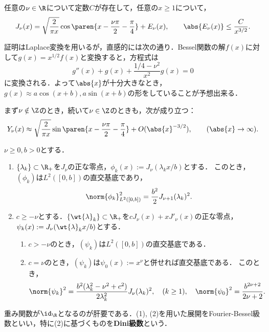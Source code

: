 \documentclass[uplatex,dvipdfmx]{jsreport}
\begin{document}
\begin{theorem}[漸近挙動]
    任意の$\nu\in\R$について定数$C$が存在して，任意の$x\ge1$について，
    \[J_\nu(x)=\sqrt{\frac{2}{\pi x}}\cos\paren{x-\frac{\nu\pi}{2}-\frac{\pi}{4}}+E_\nu(x),\qquad \abs{E_\nu(x)}\le\frac{C}{x^{3/2}}.\]
\end{theorem}
\begin{remarks}
    証明はLaplace変換を用いるが，直感的には次の通り．Bessel関数の解$f(x)$に対して$g(x)=x^{1/2}f(x)$と変換すると，方程式は
    \[g''(x)+g(x)+\frac{1/4-\nu^2}{x^2}g(x)=0\]
    に変換される．よって$\abs{x}$が十分大きなとき，$g(x)\approx a\cos(x+b),a\sin(x+b)$の形をしていることが予想出来る．
\end{remarks}

\begin{corollary}
    まず$\nu\notin\Z$のとき，続いて$\nu\in\Z$のときも，次が成り立つ：
    \[Y_\nu(x)\approx\sqrt{\frac{2}{\pi x}}\sin\paren{x-\frac{\nu\pi}{2}-\frac{\pi}{4}}+O(\abs{x}^{-3/2}),\qquad (\abs{x}\to\infty).\]
\end{corollary}

\begin{theorem}
    $\nu\ge0,b>0$とする．
    \begin{enumerate}
        \item $\{\lambda_k\}\subset\R_+$を$J_\nu$の正な零点，$\phi_k(x):=J_\nu(\lambda_kx/b)$とする．
        このとき，$(\phi_k)$は$L^2([0,b])$の直交基底であり，
        \[\norm{\phi_k}^2_{L^2([0,b])}=\frac{b^2}{2}J_{\nu+1}(\lambda_k)^2.\]
        \item $c\ge-\nu$とする．$\{\wt{\lambda}_k\}\subset\R_+$を$cJ_\nu(x)+xJ'_\nu(x)$の正な零点，$\psi_k(x):=J_\nu(\wt{\lambda}_kx/b)$とする．
        \begin{enumerate}
            \item $c>-\nu$のとき，$(\psi_k)$は$L^2([0,b])$の直交基底である．
            \item $c=\nu$のとき，$(\psi_k)$は$\psi_0(x):=x^\nu$と併せれば直交基底である．
            このとき，
        \[\norm{\psi_k}^2=\frac{b^2(\lambda^2_k-\nu^2+c^2)}{2\lambda_k^2}J_\nu(\lambda_k)^2,\quad(k\ge1),\quad\norm{\psi_0}^2=\frac{b^{2\nu +2}}{2\nu+2}.\]
        \end{enumerate}
    \end{enumerate}
\end{theorem}
\begin{remarks}
    重み関数が$\id_\R$となるのが肝要である．(1), (2)を用いた展開をFourier-Bessel級数といい，特に(2)に基づくものを\textbf{Dini級数}という．
\end{remarks}
\end{document}

